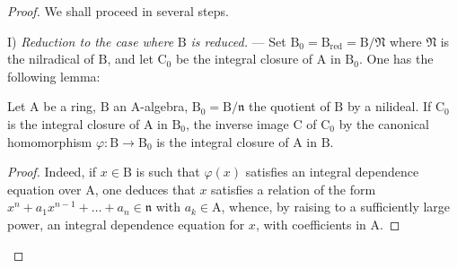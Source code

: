 \begin{proof}
We shall proceed in several steps.

I) \emph{Reduction to the case where} $\mathrm{B}$ \emph{is reduced.} --- Set $\mathrm{B}_0=\mathrm{B}_{\mathrm{red}}=\mathrm{B}/\mathfrak{N}$ where $\mathfrak{N}$ is the
nilradical of $\mathrm{B}$, and let $\mathrm{C}_0$ be the integral closure of $\mathrm{A}$ in $\mathrm{B}_0$. One has the following lemma:

\begin{lemma}[6.14.4.1]
\label{IV.6.14.4.1}
Let $\mathrm{A}$ be a ring, $\mathrm{B}$ an $\mathrm{A}$-algebra, $\mathrm{B}_0=\mathrm{B}/\mathfrak{n}$ the quotient of $\mathrm{B}$
by a nilideal. If $\mathrm{C}_0$ is the integral closure of $\mathrm{A}$ in $\mathrm{B}_0$, the inverse image $\mathrm{C}$ of $\mathrm{C}_0$ by
the canonical homomorphism $\varphi:\mathrm{B}\to\mathrm{B}_0$ is the integral closure of $\mathrm{A}$ in $\mathrm{B}$.
\end{lemma}

\begin{proof}
Indeed, if $x\in\mathrm{B}$ is such that $\varphi(x)$ satisfies an integral dependence equation
over $\mathrm{A}$, one deduces that $x$ satisfies a relation of the form
$x^n+a_1 x^{n-1}+\ldots+a_n\in\mathfrak{n}$ with $a_k\in\mathrm{A}$, whence, by raising to a sufficiently large power, an
integral dependence equation for $x$, with coefficients in $\mathrm{A}$.
\end{proof}


\end{proof}
